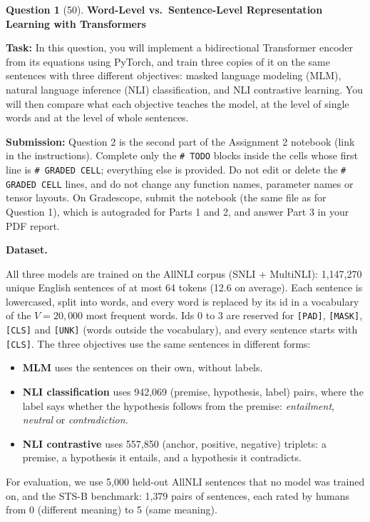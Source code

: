 \documentclass[12pt]{article}
\newif\ifexercise
\theoremstyle{definition}
\newtheorem{exercise}{Question}%
\newcommand{\Exercise}[1]{
\ifexercise#1\fi
}
\newif\ifexercise
\begin{document}
\begin{exercise}[50] \textbf{Word-Level vs.\ Sentence-Level Representation Learning with Transformers}
\Exercise{\label{ex:transformer}}
\sloppy

\textbf{Task:} In this question, you will implement a bidirectional Transformer encoder from its equations using
PyTorch, and train three copies of it on the same sentences with three different objectives: masked language
modeling (MLM), natural language inference (NLI) classification, and NLI contrastive learning. You will then compare
what each objective teaches the model, at the level of single words and at the level of whole sentences.

\textbf{Submission:} Question 2 is the second part of the Assignment 2 notebook (link in the instructions). Complete only the
\texttt{\# TODO} blocks inside the cells whose first line is \texttt{\# GRADED CELL}; everything else is provided. Do
not edit or delete the \texttt{\# GRADED CELL} lines, and do not change any function names, parameter names or tensor
layouts. On Gradescope, submit the notebook (the same file as for Question 1), which is autograded for Parts 1 and 2,
and answer Part 3 in your PDF report.

\textbf{Dataset.}

All three models are trained on the AllNLI corpus (SNLI + MultiNLI): 1{,}147{,}270 unique English sentences of at most
64 tokens (12.6 on average). Each sentence is lowercased, split into words, and every word is replaced by its id in a
vocabulary of the $V = 20{,}000$ most frequent words. Ids 0 to 3 are reserved for \texttt{[PAD]}, \texttt{[MASK]},
\texttt{[CLS]} and \texttt{[UNK]} (words outside the vocabulary), and every sentence starts with \texttt{[CLS]}. The
three objectives use the same sentences in different forms:
\begin{itemize}
  \item \textbf{MLM} uses the sentences on their own, without labels.
  \item \textbf{NLI classification} uses 942{,}069 (premise, hypothesis, label) pairs, where the label says whether the
        hypothesis follows from the premise: \emph{entailment}, \emph{neutral} or \emph{contradiction}.
  \item \textbf{NLI contrastive} uses 557{,}850 (anchor, positive, negative) triplets: a premise, a hypothesis it
        entails, and a hypothesis it contradicts.
\end{itemize}
For evaluation, we use 5{,}000 held-out AllNLI sentences that no model was trained on, and the STS-B benchmark:
1{,}379 pairs of sentences, each rated by humans from 0 (different meaning) to 5 (same meaning).


\end{exercise}
\end{document}
